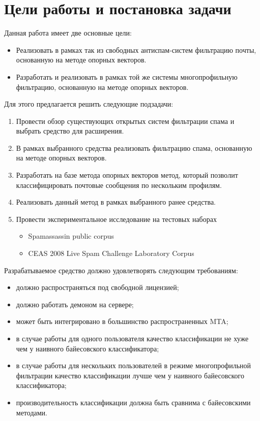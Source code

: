 \newpage
\section{Цели работы и постановка задачи}


Данная работа имеет две основные цели:
\begin{itemize}
\item Реализовать в рамках так из свободных антиспам-систем фильтрацию почты, основанную на методе опорных векторов.
\item Разработать и реализовать в рамках той же системы многопрофильную фильтрацию, основанную на методе опорных векторов.
\end{itemize}

Для этого предлагается решить следующие подзадачи:
\begin{enumerate}
\item  Провести обзор существующих открытых систем фильтрации спама и выбрать средство для расширения. 
\item В рамках выбранного средства реализовать фильтрацию спама, основанную на методе опорных векторов.
\item Разработать на базе метода опорных векторов метод, который позволит классифицировать почтовые сообщения по нескольким профилям.
\item Реализовать данный метод в рамках выбранного ранее средства.
\item Провести экспериментальное исследование на тестовых наборах
\begin{itemize}
    \item Spamassassin public corpus
    \item CEAS 2008 Live Spam Challenge Laboratory Corpus
\end{itemize}
\end{enumerate}

Разрабатываемое средство должно удовлетворять следующим требованиям:
\begin{itemize}
\item должно распространяться под свободной лицензией;
\item должно работать демоном на сервере;
\item может быть интегрировано в большинство распространенных MTA;
\item в случае работы для одного пользователя качество классификации не хуже чем у наивного байесовского классификатора;
\item в случае работы для нескольких пользователей в режиме многопрофильной фильтрации качество классификации лучше чем у наивного байесовского классификатора;
\item производительность классификации должна быть сравнима с байесовскими методами.
\end{itemize}
